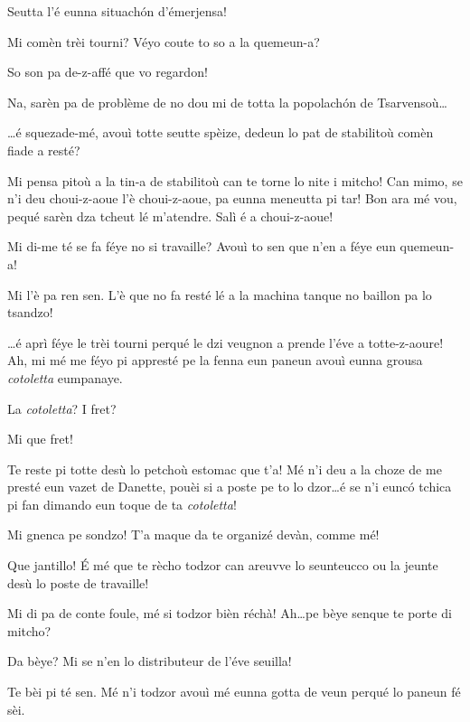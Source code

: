 \begin{drama}
\Seunteuccospeaks{} Seutta l’é eunna situach\'on d’émerjensa!

\Diegospeaks Mi comèn trèi tourni? Véyo coute to so a la quemeun-a?

\Seunteuccospeaks So son pa de-z-affé que vo regardon!

\Diegospeaks Na, sarèn pa de problème de no dou mi de totta la popolach\'on de Tsarvensoù\ldots

\Attilaspeaks \ldots é squezade-mé, avouì totte seutte spèize, dedeun lo pat de stabilitoù comèn fiade a resté?

\Seunteuccospeaks Mi pensa pitoù a la tin-a de stabilitoù can te torne lo nite i mitcho! Can mimo, se n'i deu choui-z-aoue l'è choui-z-aoue, pa eunna meneutta pi tar! Bon ara mé vou, pequé sarèn dza tcheut lé m’atendre. Salì é a choui-z-aoue! 


\Attilaspeaks Mi di-me té se fa féye no si travaille? Avouì to sen que n'en a féye eun quemeun-a!

\Diegospeaks Mi l'è pa ren sen. L'è que no fa resté lé a la machina tanque no baillon pa lo tsandzo!

\Attilaspeaks \ldots é aprì féye le trèi tourni perqué le dzi veugnon a prende l'éve a totte-z-aoure! Ah, mi mé me féyo pi appresté pe la fenna eun paneun avouì eunna grousa \textit{cotoletta} eumpanaye.

\Diegospeaks La \textit{cotoletta}? I fret? \frette

\Attilaspeaks Mi que fret!

\Diegospeaks Te reste pi totte desù lo  petchoù estomac  que t'a! Mé n'i deu a la choze de me presté eun vazet de Danette, pouèi si a poste pe to lo dzor\ldots é se n'i eunc\'o tchica pi fan dimando eun toque de ta \textit{cotoletta}!

\Attilaspeaks Mi  gnenca pe sondzo! T'a maque da te organizé devàn, comme mé!

\Diegospeaks Que jantillo! \'E mé que te rècho todzor can areuvve lo seunteucco ou la jeunte desù lo poste de travaille! 

\Attilaspeaks Mi di pa de conte foule, mé si todzor bièn réchà! Ah\ldots pe bèye senque te porte di mitcho?

\Diegospeaks Da bèye? Mi se n'en lo distributeur de l'éve seuilla!

\Attilaspeaks Te bèi pi té sen. Mé n'i todzor avouì mé eunna gotta de veun  perqué lo paneun fé sèi.


\end{drama}
